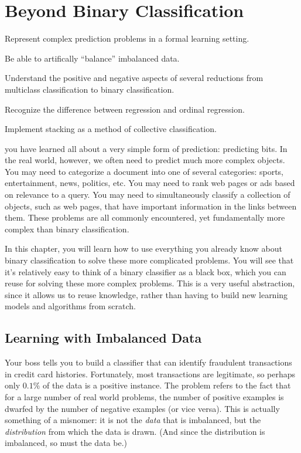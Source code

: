 
\chapter{Beyond Binary Classification} \label{sec:complex}

\chapterquote{}{}

\begin{learningobjectives}
\item Represent complex prediction problems in a formal learning
  setting.
\item Be able to artifically ``balance'' imbalanced data.
\item Understand the positive and negative aspects of several
  reductions from multiclass classification to binary classification.
\item Recognize the difference between regression and ordinal
  regression.
\item Implement stacking as a method of collective classification.
\end{learningobjectives}

\dependencies{}

 you have learned all about a
very simple form of prediction: predicting bits.  In the real world,
however, we often need to predict much more complex objects.  You may
need to categorize a document into one of several categories: sports,
entertainment, news, politics, etc.  You may need to rank web pages or
ads based on relevance to a query.  You may need to simultaneously
classify a collection of objects, such as web pages, that have
important information in the links between them.  These problems are
all commonly encountered, yet fundamentally more complex than binary
classification.

In this chapter, you will learn how to use everything you already know
about binary classification to solve these more complicated problems.
You will see that it's relatively easy to think of a binary classifier
as a black box, which you can reuse for solving these more complex
problems.  This is a very useful abstraction, since it allows us to
reuse knowledge, rather than having to build new learning models and
algorithms from scratch.


\section{Learning with Imbalanced Data}

Your boss tells you to build a classifier that can identify fraudulent
transactions in credit card histories.  Fortunately, most transactions
are legitimate, so perhaps only $0.1\%$ of the data is a positive
instance.  The  problem refers to the fact
that for a large number of real world problems, the number of positive
examples is dwarfed by the number of negative examples (or vice
versa).  This is actually something of a misnomer: it is not the
\emph{data} that is imbalanced, but the \emph{distribution} from which
the data is drawn.  (And since the distribution is imbalanced, so must
the data be.)

